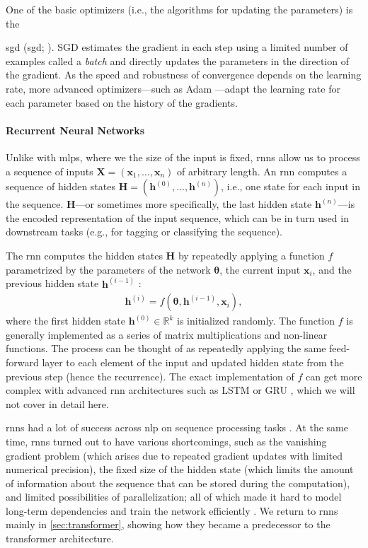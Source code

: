 One of the basic optimizers (i.e., the algorithms for updating the parameters) is the {\acl{sgd} (\acs{sgd}; \citealp[p.~275]{goodfellow2016deep}). SGD estimates the gradient in each step using a limited number of examples called a \emph{batch} and directly updates the parameters in the direction of the gradient. As the speed and robustness of convergence depends on the learning rate, more advanced optimizers---such as Adam \cite{kingma2014adam}---adapt the learning rate for each parameter based on the history of the gradients.

\paragraph{Recurrent Neural Networks} Unlike with \acp{mlp}, where we the size of the input is fixed, \acp{rnn} allow us to process a sequence of inputs $\mathbf{X} = (\mathbf{x}_1, \ldots, \mathbf{x}_n)$ of arbitrary length. An \ac{rnn} computes a sequence of hidden states $\mathbf{H} = (\mathbf{h}^{(0)}, \ldots, \mathbf{h}^{(n)})$, i.e., one state for each input in the sequence. $\mathbf{H}$---or sometimes more specifically, the last hidden state $\mathbf{h}^{(n)}$---is the encoded representation of the input sequence, which can be in turn used in downstream tasks (e.g., for tagging or classifying the sequence).

The \ac{rnn} computes the hidden states $\mathbf{H}$ by repeatedly applying a function $f$ parametrized by the parameters of the network $\boldsymbol{\theta}$, the current input $\mathbf{x}_i$, and the previous hidden state $\mathbf{h}^{(i-1)}$ \cite[p.~367]{goodfellow2016deep}:
\begin{align}
    \mathbf{h}^{(i)} = f(\boldsymbol{\theta}, \mathbf{h}^{(i-1)}, \mathbf{x}_i),
\end{align}
where the first hidden state $\mathbf{h}^{(0)} \in \mathbb{R}^k$ is initialized randomly. The function $f$ is generally implemented as a series of matrix multiplications and non-linear functions. The process can be thought of as repeatedly applying the same feed-forward layer to each element of the input and updated hidden state from the previous step (hence the recurrence). The exact implementation of $f$ can get more complex with advanced \ac{rnn} architectures such as LSTM \cite{hochreiter1997long} or GRU \cite{cho2014learning}, which we will not cover in detail here.

\acp{rnn} had a lot of success across \ac{nlp} on sequence processing tasks \cite{karpathy2015unreasonable,salehinejad2017recent}. At the same time, \acp{rnn} turned out to have various shortcomings, such as the vanishing gradient problem (which arises due to repeated gradient updates with limited numerical precision), the fixed size of the hidden state (which limits the amount of information about the sequence that can be stored during the computation), and limited possibilities of parallelization; all of which made it hard to model long-term dependencies and train the network efficiently \cite{hochreiter1998vanishing,pascanu2013difficulty}. We return to \acp{rnn} mainly in \autoref{sec:transformer}, showing how they became a predecessor to the transformer architecture.


}
